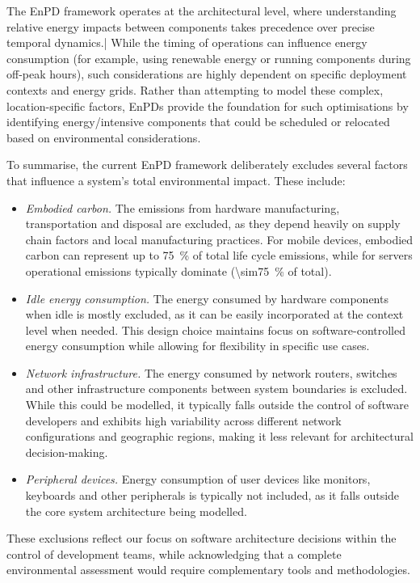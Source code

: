 \documentclass[11pt,a4paper]{article}
\begin{document}
The EnPD framework operates at the architectural level, where understanding relative energy impacts between components takes precedence over precise temporal dynamics.|
While the timing of operations can influence energy consumption (for example, using renewable energy or running components during off-peak hours), such considerations are highly dependent on specific deployment contexts and energy grids.
Rather than attempting to model these complex, location-specific factors, EnPDs provide the foundation for such optimisations by identifying energy\-/intensive components that could be scheduled or relocated based on environmental considerations.

To summarise, the current EnPD framework deliberately excludes several factors that influence a system's total environmental impact.
These include:
\begin{itemize}
  \item \emph{Embodied carbon.} The emissions from hardware manufacturing, transportation and disposal are excluded, as they depend heavily on supply chain factors and local manufacturing practices.
  For mobile devices, embodied carbon can represent up to \qty{75}{\percent} of total life cycle emissions, while for servers operational emissions typically dominate (\qty{\sim75}{\percent} of total).
  \item \emph{Idle energy consumption.} The energy consumed by hardware components when idle is mostly excluded, as it can be easily incorporated at the context level when needed.
  This design choice maintains focus on soft\-ware-controlled energy consumption while allowing for flexibility in specific use cases.
  \item \emph{Network infrastructure.} The energy consumed by network routers, switches and other infrastructure components between system boundaries is excluded.
  While this could be modelled, it typically falls outside the control of software developers and exhibits high variability across different network configurations and geographic regions, making it less relevant for architectural decision-making.
  \item \emph{Peripheral devices.} Energy consumption of user devices like monitors, keyboards and other peripherals is typically not included, as it falls outside the core system architecture being modelled.
\end{itemize}

These exclusions reflect our focus on software architecture decisions within the control of development teams, while acknowledging that a complete environmental assessment would require complementary tools and methodologies.
\end{document}
